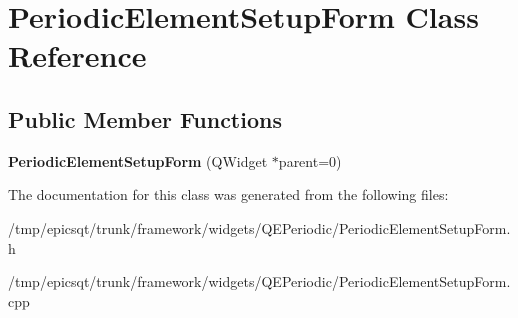\hypertarget{classPeriodicElementSetupForm}{
\section{PeriodicElementSetupForm Class Reference}
\label{classPeriodicElementSetupForm}
}
\subsection*{Public Member Functions}
\begin{DoxyCompactItemize}
\item 
\hypertarget{classPeriodicElementSetupForm_a940a28c6abe0e29568a9680f638fdd43}{
{\bfseries PeriodicElementSetupForm} (QWidget $\ast$parent=0)}
\label{classPeriodicElementSetupForm_a940a28c6abe0e29568a9680f638fdd43}

\end{DoxyCompactItemize}


The documentation for this class was generated from the following files:\begin{DoxyCompactItemize}
\item 
/tmp/epicsqt/trunk/framework/widgets/QEPeriodic/PeriodicElementSetupForm.h\item 
/tmp/epicsqt/trunk/framework/widgets/QEPeriodic/PeriodicElementSetupForm.cpp\end{DoxyCompactItemize}
